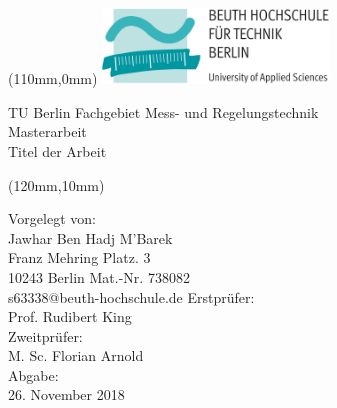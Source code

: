 \begin{titlepage}
	\begin{textblock*}{0mm}(110mm,0mm)
			\includegraphics[width=60mm]{Abbildungen/Deckblatt-Beuth/Beuth_Logo.png}  
	\end{textblock*} 

\vspace*{4cm}
    
    \begin{cmssb}
    	\begin{flushleft}
    		\vspace*{10pt} 
    		\textsf{\fontsize{14}{0}\selectfont TU Berlin Fachgebiet Mess- und Regelungstechnik}\\
			\vspace*{10pt} 
			\textsf{\fontsize{30}{0}\selectfont Masterarbeit}\\
			\vspace*{10pt}
			\textcolor{tured}{\textsf{\fontsize{14}{0}\selectfont Titel der Arbeit}}
		\end{flushleft}
	\end{cmssb}
 
\begin{textblock*}{60mm}(120mm,10mm)
    \begin{flushleft}
    	\begin{cmss}
    		\begin{normalsize}		
    			\textcolor{tugrey}{Vorgelegt von:}\\
				Jawhar Ben Hadj M'Barek\\
				Franz Mehring Platz. 3\\
				10243 Berlin \linebreak\linebreak
				Mat.-Nr. 738082\\
				s63338@beuth-hochschule.de
				\linebreak\linebreak\linebreak
				\textcolor{tugrey}{Erstprüfer:}\\
				Prof. Rudibert King\\
				\textcolor{tugrey}{Zweitprüfer:}\\
				M. Sc. Florian Arnold\\
				\textcolor{tugrey}{Abgabe:}\\
				26. November 2018\linebreak\linebreak
			\end{normalsize}	
		\end{cmss}
    \end{flushleft}    
\end{textblock*} 	

\end{titlepage}

\newpage

\thispagestyle{empty}

